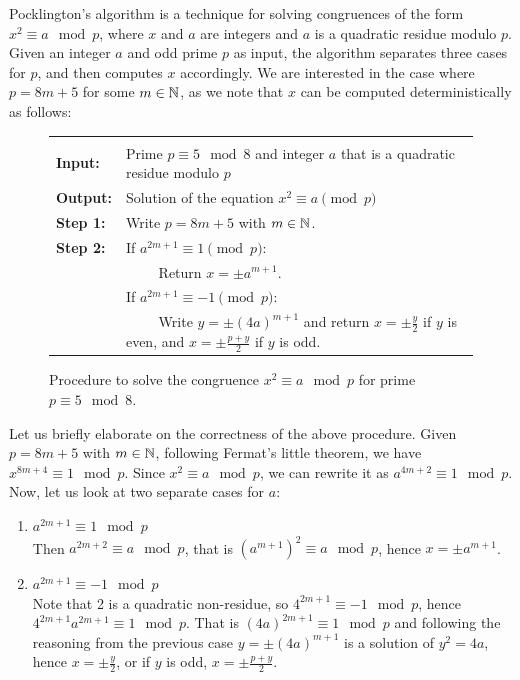 Pocklington's algorithm is a technique for solving congruences of the form $x^2 \equiv a \mod p$, where $x$ and $a$ are integers and $a$ is a quadratic residue modulo $p$. Given an integer $a$ and odd prime $p$ as input, the algorithm separates three cases for $p$, and then computes $x$ accordingly. We are interested in the case where  $p = 8m + 5$ for some $m\in\mathbb{N}$, as we note that $x$ can be computed deterministically as follows:

\begin{figure}[H]
    \centering
    \begin{tabularx}{0.82\textwidth}{ p{} p{} }
   \rowcolor{Gray}
    \multicolumn{2}{c}{\textbf{Pocklington's algorithm for $p=8m+5$}}
    \\
    \textbf{Input:} & Prime $p \equiv 5 \mod 8$ and integer $a$ that is a quadratic residue modulo $p$ \\ 
    \rowcolor{Gray}
    \textbf{Output:} & Solution of the equation $x^2 \equiv a \pmod{p}$
    \\ 
    \textbf{Step 1:} &
            Write $p = 8m + 5$ with $m\in\mathbb{N}$.
  \\
    \textbf{Step 2:} &
       If $a^{2m+1} \equiv 1 \pmod{p}$:
    \\ & $\qquad$ Return $x = \pm a^{m+1}$.
    \\ & If $a^{2m+1} \equiv -1 \pmod{p}$:
    \\ & $\qquad$ Write $y = \pm(4a)^{m+1}$ and return $x=\pm\frac{y}{2}$ if $y$ is even, and
    $x=\pm\frac{p+y}{2}$ if $y$ is odd.\\
   \hline
       \end{tabularx}
    \caption{Procedure to solve the congruence $x^2\equiv a \mod p$ for prime $p \equiv 5 \mod 8$.}
    \label{fig:pocklington}
\end{figure}

Let us briefly elaborate on the correctness of the above procedure. Given $p = 8m + 5$ with $m\in\mathbb{N}$, following Fermat's little theorem, we have $x^{8m+4} \equiv 1 \mod p$. Since $x^2\equiv a \mod p$, we can rewrite it as $a^{4m+2} \equiv 1 \mod p$. Now, let us look at two separate cases for $a$:
\begin{enumerate}
    \item $a^{2m+1} \equiv 1 \mod p$ \\
    Then $a^{2m+2} \equiv a \mod p$, that is $(a^{m+1})^2 \equiv a \mod p$, hence $x = \pm a^{m+1}$.
    \item $a^{2m+1} \equiv -1 \mod p$ \\
    Note that 2 is a quadratic non-residue, so $4^{2m+1}\equiv -1 \mod p$, hence $4^{2m+1}a^{2m+1}\equiv 1 \mod p$. That is $(4a)^{2m+1}\equiv 1 \mod p$ and following the reasoning from the previous case $y = \pm(4a)^{m+1}$ is a solution of $y^2=4a$, hence $x=\pm\frac{y}{2}$, or if $y$ is odd, $x=\pm\frac{p+y}{2}$.
\end{enumerate}